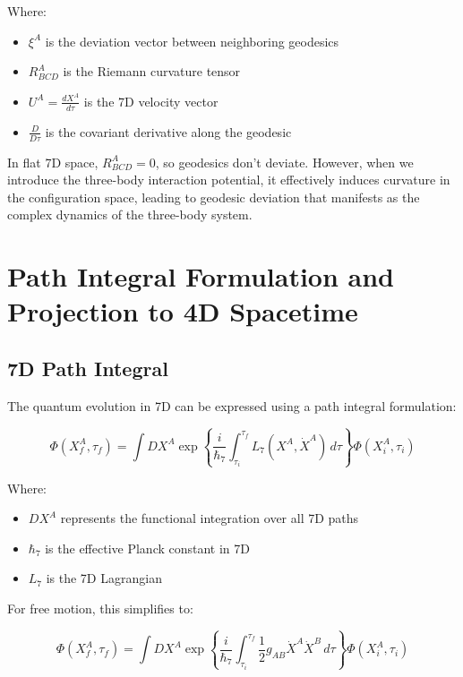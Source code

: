 \documentclass{article}
\begin{document}
Where:
\begin{itemize}
\item $\xi^A$ is the deviation vector between neighboring geodesics
\item $R^A_{BCD}$ is the Riemann curvature tensor
\item $U^A = \frac{dX^A}{d\tau}$ is the 7D velocity vector
\item $\frac{D}{D\tau}$ is the covariant derivative along the geodesic
\end{itemize}

In flat 7D space, $R^A_{BCD} = 0$, so geodesics don't deviate. However, when we introduce the three-body interaction potential, it effectively induces curvature in the configuration space, leading to geodesic deviation that manifests as the complex dynamics of the three-body system.

\section{Path Integral Formulation and Projection to 4D Spacetime}

\subsection{7D Path Integral}

The quantum evolution in 7D can be expressed using a path integral formulation:

\begin{equation}
\Phi(X^A_f, \tau_f) = \int DX^A \exp\left\{\frac{i}{\hbar_7} \int_{\tau_i}^{\tau_f} L_7(X^A, \dot{X}^A) \, d\tau \right\} \Phi(X^A_i, \tau_i)
\end{equation}

Where:
\begin{itemize}
\item $DX^A$ represents the functional integration over all 7D paths
\item $\hbar_7$ is the effective Planck constant in 7D
\item $L_7$ is the 7D Lagrangian
\end{itemize}

For free motion, this simplifies to:

\begin{equation}
\Phi(X^A_f, \tau_f) = \int DX^A \exp\left\{\frac{i}{\hbar_7} \int_{\tau_i}^{\tau_f} \frac{1}{2}g_{AB}\dot{X}^A\dot{X}^B \, d\tau \right\} \Phi(X^A_i, \tau_i)
\end{equation}
\end{document}
